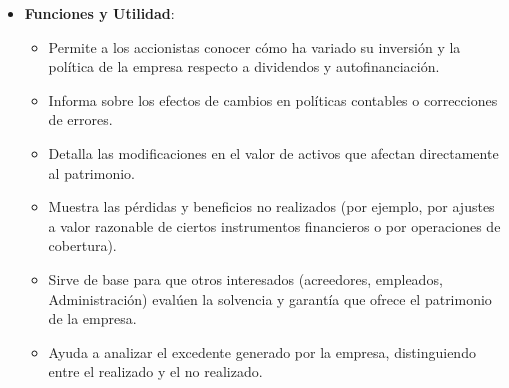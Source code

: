 \documentclass[
  paper=a4,
  ,captions=tableheading
]{scrbook}
\providecommand{\tightlist}{%
  \setlength{\itemsep}{0pt}\setlength{\parskip}{0pt}}
\begin{document}
\begin{itemize}
\tightlist
\item
  \textbf{Funciones y Utilidad}:

  \begin{itemize}
  \tightlist
  \item
    Permite a los accionistas conocer cómo ha variado su inversión y la
    política de la empresa respecto a dividendos y autofinanciación.
  \item
    Informa sobre los efectos de cambios en políticas contables o
    correcciones de errores.
  \item
    Detalla las modificaciones en el valor de activos que afectan
    directamente al patrimonio.
  \item
    Muestra las pérdidas y beneficios no realizados (por ejemplo, por
    ajustes a valor razonable de ciertos instrumentos financieros o por
    operaciones de cobertura).
  \item
    Sirve de base para que otros interesados (acreedores, empleados,
    Administración) evalúen la solvencia y garantía que ofrece el
    patrimonio de la empresa.
  \item
    Ayuda a analizar el excedente generado por la empresa, distinguiendo
    entre el realizado y el no realizado.
  \end{itemize}
\end{itemize}


\backmatter
\end{document}
